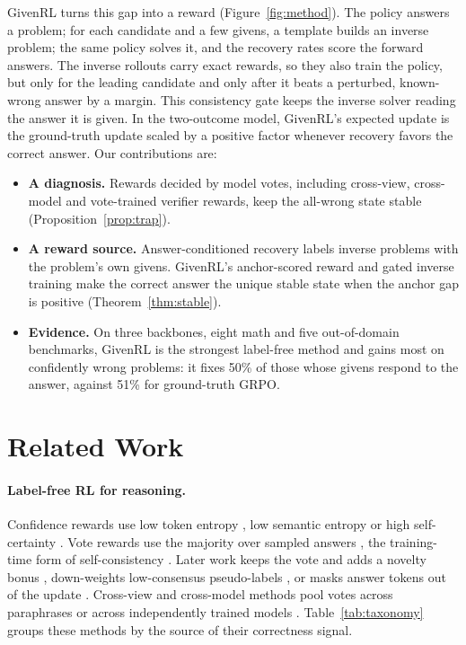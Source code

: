 \documentclass[11pt]{article}
\theoremstyle{remark}
\newcommand{\method}{GivenRL\xspace}
\begin{document}
\method turns this gap into a reward (Figure~\ref{fig:method}). The policy answers a problem; for each candidate and a few givens, a template builds an inverse problem; the same policy solves it, and the recovery rates score the forward answers. The inverse rollouts carry exact rewards, so they also train the policy, but only for the leading candidate and only after it beats a perturbed, known-wrong answer by a margin. This consistency gate keeps the inverse solver reading the answer it is given. In the two-outcome model, \method's expected update is the ground-truth update scaled by a positive factor whenever recovery favors the correct answer. Our contributions are:
\begin{itemize}[leftmargin=*,itemsep=1pt,topsep=2pt]
  \item \textbf{A diagnosis.} Rewards decided by model votes, including cross-view, cross-model and vote-trained verifier rewards, keep the all-wrong state stable (Proposition~\ref{prop:trap}).
  \item \textbf{A reward source.} Answer-conditioned recovery labels inverse problems with the problem's own givens. \method's anchor-scored reward and gated inverse training make the correct answer the unique stable state when the anchor gap is positive (Theorem~\ref{thm:stable}).
  \item \textbf{Evidence.} On three backbones, eight math and five out-of-domain benchmarks, \method is the strongest label-free method and gains most on confidently wrong problems: it fixes 50\% of those whose givens respond to the answer, against 51\% for ground-truth GRPO.
\end{itemize}

\section{Related Work}

\paragraph{Label-free RL for reasoning.}
Confidence rewards use low token entropy \citep{prabhudesai2025rent,agarwal2025entropy}, low semantic entropy \citep{zhang2025empo} or high self-certainty \citep{zhao2026intuitor}. Vote rewards use the majority over sampled answers \citep{zuo2025ttrl,shafayat2025selftrain}, the training-time form of self-consistency \citep{wang2023selfconsistency}. Later work keeps the vote and adds a novelty bonus \citep{zhou2025evolrl}, down-weights low-consensus pseudo-labels \citep{yu2026restrain}, or masks answer tokens out of the update \citep{ye2026omgrpo}. Cross-view and cross-model methods pool votes across paraphrases \citep{zhang2026corewarding,wang2026selfharmony} or across independently trained models \citep{yang2026corl}. Table~\ref{tab:taxonomy} groups these methods by the source of their correctness signal.
\end{document}
